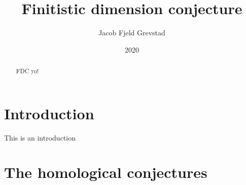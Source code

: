 \documentclass[11pt, a4paper, english]{article}
\theoremstyle{definition}
\begin{document}
\title{Finitistic dimension conjecture}
\author{Jacob Fjeld Grevstad}
\date{2020}
\maketitle
{}

\begin{abstract}
FDC yo!
\end{abstract}
\clearpage

\tableofcontents
\clearpage

\section*{Introduction}
%

This is an introduction

\section{The homological conjectures}
\end{document}

